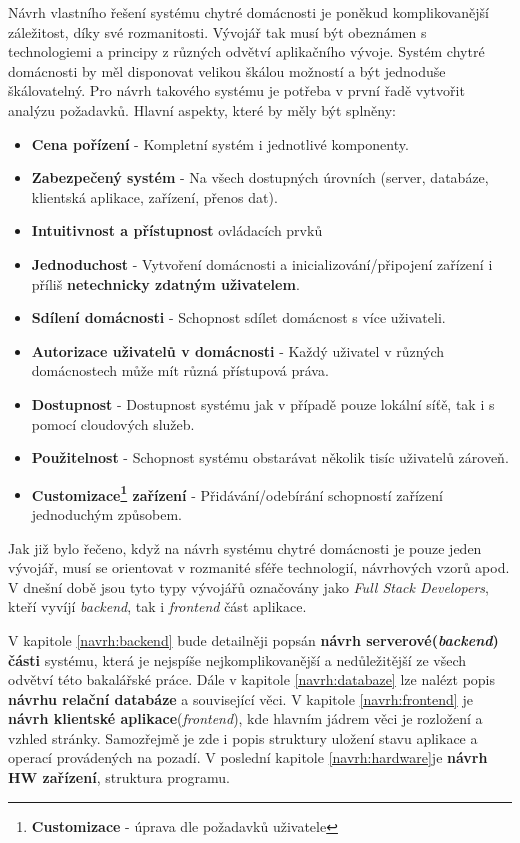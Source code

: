 Návrh vlastního řešení systému chytré domácnosti je poněkud komplikovanější záležitost, díky své rozmanitosti.
Vývojář tak musí být obeznámen s technologiemi a principy z různých odvětví aplikačního vývoje.
Systém chytré domácnosti by měl disponovat velikou škálou možností a být jednoduše škálovatelný.
Pro návrh takového systému je potřeba v první řadě vytvořit analýzu požadavků.
\newline
\newline
Hlavní aspekty, které by měly být splněny:
\begin{itemize}
  \item \textbf{Cena pořízení} - Kompletní systém i jednotlivé komponenty.
  \item \textbf{Zabezpečený systém} - Na všech dostupných úrovních (server, databáze, klientská aplikace, zařízení, přenos dat).
  \item \textbf{Intuitivnost a přístupnost} ovládacích prvků
  \item \textbf{Jednoduchost} - Vytvoření domácnosti a inicializování/připojení zařízení i příliš \textbf{netechnicky zdatným uživatelem}.
  \item \textbf{Sdílení domácnosti} - Schopnost sdílet domácnost s více uživateli.
  \item \textbf{Autorizace uživatelů v domácnosti} - Každý uživatel v různých domácnostech může mít různá přístupová práva.
  \item \textbf{Dostupnost} - Dostupnost systému jak v případě pouze lokální síťě, tak i s pomocí cloudových služeb.
  \item \textbf{Použitelnost} - Schopnost systému obstarávat několik tisíc uživatelů zároveň.
  \item \textbf{Customizace\footnote{\textbf{Customizace} - úprava dle požadavků uživatele} zařízení} - Přidávání/odebírání schopností zařízení jednoduchým způsobem.
\end{itemize}
Jak již bylo řečeno, když na návrh systému chytré domácnosti je pouze jeden vývojář, musí se orientovat v rozmanité sféře technologií, návrhových vzorů apod.
V dnešní době jsou tyto typy vývojářů označovány jako \emph{Full Stack Developers}, kteří vyvíjí \emph{backend}, tak i \emph{frontend} část aplikace.

V kapitole \ref{navrh:backend} bude detailněji popsán \textbf{návrh serverové(\emph{backend}) části} systému, která je nejspíše nejkomplikovanější a nedůležitější ze všech odvětví této bakalářské práce.
Dále v kapitole \ref{navrh:databaze} lze nalézt popis \textbf{návrhu relační databáze} a související věci.
V kapitole \ref{navrh:frontend} je \textbf{návrh klientské aplikace}(\emph{frontend}), kde hlavním jádrem věci je rozložení a vzhled stránky.
Samozřejmě je zde i popis struktury uložení stavu aplikace a operací provádených na pozadí.
V poslední kapitole \ref{navrh:hardware}je \textbf{návrh HW zařízení}, struktura programu.
\newpage

